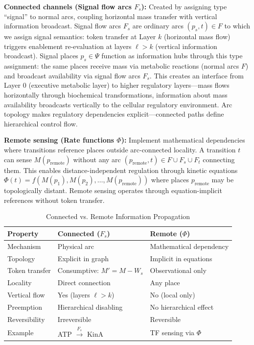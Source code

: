 \documentclass[10pt,letterpaper]{article}
\begin{document}
\textbf{Connected channels (Signal flow arcs $F_s$):} Created by assigning type ``signal'' to normal arcs, coupling horizontal mass transfer with vertical information broadcast. Signal flow arcs $F_s$ are ordinary arcs $(p_s, t) \in F$ to which we assign signal semantics: token transfer at Layer $k$ (horizontal mass flow) triggers enablement re-evaluation at layers $\ell > k$ (vertical information broadcast). Signal places $p_s \in \Psi$ function as information hubs through this type assignment: the same places receive mass via metabolic reactions (normal arcs $F$) and broadcast availability via signal flow arcs $F_s$. This creates an interface from Layer 0 (executive metabolic layer) to higher regulatory layers---mass flows horizontally through biochemical transformations, information about mass availability broadcasts vertically to the cellular regulatory environment. Arc topology makes regulatory dependencies explicit---connected paths define hierarchical control flow.

\textbf{Remote sensing (Rate functions $\Phi$):} Implement mathematical dependencies where transitions reference places outside arc-connected locality. A transition $t$ can sense $M(p_{\text{remote}})$ without any arc
$(p_{\text{remote}}, t) \in F \cup F_s \cup F_t$
connecting them. This enables distance-independent regulation through kinetic equations
$\Phi(t) = f(M(p_1), M(p_2), \ldots, M(p_{\text{remote}}))$
where places $p_{\text{remote}}$ may be topologically distant. Remote sensing operates through equation-implicit references without token transfer.

\begin{table}[h]
\centering
\footnotesize
\caption{Connected vs. Remote Information Propagation}
\begin{tabular}{p{2.2cm}p{3.9cm}p{3.9cm}}
\toprule
\textbf{Property} & \textbf{Connected ($F_s$)} & \textbf{Remote ($\Phi$)} \\
\midrule
Mechanism & Physical arc & Mathematical dependency \\
Topology & Explicit in graph & Implicit in equations \\
Token transfer & Consumptive: $M' = M - W_s$ & Observational only \\
Locality & Direct connection & Any place \\
Vertical flow & Yes (layers $\ell > k$) & No (local only) \\
Preemption & Hierarchical disabling & No hierarchical effect \\
Reversibility & Irreversible & Reversible \\
Example & ATP $\xrightarrow{F_s}$ KinA & TF sensing via $\Phi$ \\
\bottomrule
\end{tabular}
\end{table}
\end{document}

